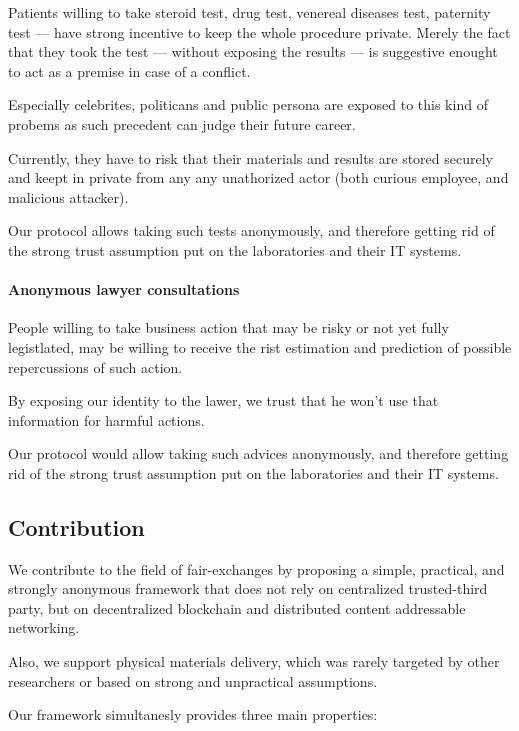 \documentclass{ieeeaccess}
\begin{document}
Patients willing to take steroid test, drug test, venereal diseases
test, paternity test --- have strong incentive to keep the whole
procedure private. Merely the fact that they took the test --- without
exposing the results --- is suggestive enought to act as a premise in
case of a conflict.

Especially celebrites, politicans and public persona are exposed to this
kind of probems as such precedent can judge their future career.

Currently, they have to risk that their materials and results are stored
securely and keept in private from any any unathorized actor (both
curious employee, and malicious attacker).

Our protocol allows taking such tests anonymously, and therefore getting
rid of the strong trust assumption put on the laboratories and their IT
systems.


\paragraph{Anonymous lawyer consultations} \label{anonymous-lawyer-consultations}

People willing to take business action that may be risky or not yet
fully legistlated, may be willing to receive the rist estimation and
prediction of possible repercussions of such action.

By exposing our identity to the lawer, we trust that he won't use that
information for harmful actions.

Our protocol would allow taking such advices anonymously, and therefore
getting rid of the strong trust assumption put on the laboratories and
their IT systems.


\subsection{Contribution}
We contribute to the field of fair-exchanges by proposing a simple,
practical, and strongly anonymous framework that does not rely on
centralized trusted-third party, but on decentralized blockchain and
distributed content addressable networking.

Also, we support physical materials delivery, which was rarely targeted
by other researchers or based on strong and unpractical assumptions.

Our framework simultanesly provides three main properties:
\end{document}
